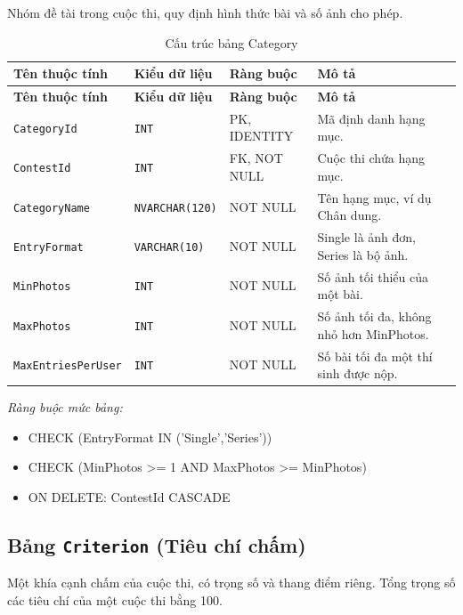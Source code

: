 Nhóm đề tài trong cuộc thi, quy định hình thức bài và số ảnh cho phép.

\begin{longtable}{|L{4cm}|L{3.15cm}|L{2.4cm}|L{4.55cm}|}
\caption{Cấu trúc bảng Category} \\
\hline
\textbf{Tên thuộc tính} & \textbf{Kiểu dữ liệu} & \textbf{Ràng buộc} & \textbf{Mô tả} \\ \hline
\endfirsthead
\hline
\textbf{Tên thuộc tính} & \textbf{Kiểu dữ liệu} & \textbf{Ràng buộc} & \textbf{Mô tả} \\ \hline
\endhead
\texttt{CategoryId} & \texttt{INT} & PK, IDENTITY & Mã định danh hạng mục. \\ \hline
\texttt{ContestId} & \texttt{INT} & FK, NOT NULL & Cuộc thi chứa hạng mục. \\ \hline
\texttt{CategoryName} & \texttt{NVARCHAR(120)} & NOT NULL & Tên hạng mục, ví dụ Chân dung. \\ \hline
\texttt{EntryFormat} & \texttt{VARCHAR(10)} & NOT NULL & Single là ảnh đơn, Series là bộ ảnh. \\ \hline
\texttt{MinPhotos} & \texttt{INT} & NOT NULL & Số ảnh tối thiểu của một bài. \\ \hline
\texttt{MaxPhotos} & \texttt{INT} & NOT NULL & Số ảnh tối đa, không nhỏ hơn MinPhotos. \\ \hline
\texttt{MaxEntriesPerUser} & \texttt{INT} & NOT NULL & Số bài tối đa một thí sinh được nộp. \\ \hline
\end{longtable}

\noindent\textit{Ràng buộc mức bảng:}

\begin{itemize}\raggedright
    \item CHECK (EntryFormat IN ('Single',\allowbreak{}'Series'))
    \item CHECK (MinPhotos >= 1 AND MaxPhotos >= MinPhotos)
    \item ON DELETE: ContestId CASCADE
\end{itemize}

\subsection{Bảng \texttt{Criterion} (Tiêu chí chấm)}

Một khía cạnh chấm của cuộc thi, có trọng số và thang điểm riêng. Tổng trọng số các tiêu chí của một cuộc thi bằng 100.

